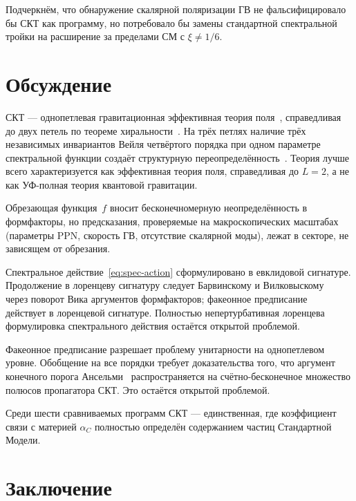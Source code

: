 \documentclass[12pt,a4paper]{article}
\theoremstyle{plain}
\theoremstyle{definition}
\theoremstyle{remark}
\begin{document}
Подчеркнём, что обнаружение скалярной поляризации ГВ не
фальсифицировало бы СКТ как программу, но потребовало бы замены
стандартной спектральной тройки на расширение за пределами СМ с $\xi \neq 1/6$.

\section{Обсуждение}
\label{sec:discussion}

СКТ --- однопетлевая гравитационная эффективная теория
поля~\cite{Donoghue:1994}, справедливая до двух петель по теореме
хиральности~\cite{Alfyorov:2026paper3}. На трёх петлях наличие
трёх независимых инвариантов Вейля четвёртого порядка при одном параметре
спектральной функции создаёт структурную
переопределённость~\cite{Alfyorov:2026paper3}. Теория лучше всего
характеризуется как эффективная теория поля, справедливая до $L = 2$, а не как
УФ-полная теория квантовой гравитации.

Обрезающая функция~$f$ вносит бесконечномерную неопределённость в
формфакторы, но предсказания, проверяемые на макроскопических
масштабах (параметры PPN, скорость ГВ, отсутствие скалярной моды),
лежат в секторе, не зависящем от обрезания.

Спектральное действие~\eqref{eq:spec-action} сформулировано в
евклидовой сигнатуре. Продолжение в лоренцеву сигнатуру следует
Барвинскому и Вилковыскому~\cite{BV:1990} через поворот Вика
аргументов формфакторов; факеонное
предписание~\cite{Anselmi:2017} действует в лоренцевой сигнатуре.
Полностью непертурбативная лоренцева формулировка спектрального
действия остаётся открытой проблемой.

Факеонное предписание разрешает проблему унитарности на однопетлевом
уровне. Обобщение на все порядки требует доказательства того, что
аргумент конечного порога Ансельми~\cite{Anselmi:2018}
распространяется на счётно-бесконечное множество полюсов пропагатора
СКТ. Это остаётся открытой проблемой.

Среди шести сравниваемых программ СКТ --- единственная, где
коэффициент связи с материей $\alpha_C$ полностью определён
содержанием частиц Стандартной Модели.

\section{Заключение}
\label{sec:conclusions}
\end{document}
